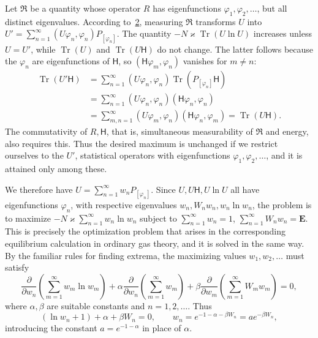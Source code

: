 \documentclass[fontsize=13pt,twoside,openany,headings=normal,parskip=false,bookmarkpackage=false,DIV=calc]{scrbook}
\begin{document}
Let $\mathfrak R$ be a quantity whose operator $R$ has eigenfunctions $\varphi_1,\varphi_2,\ldots$, but all distinct eigenvalues. According to~\hyperref[eq:V.1.2]{2}, measuring $\mathfrak R$ transforms $U$ into $U'=\sum_{n=1}^{\infty}(U\varphi_n,\varphi_n)P_{[\varphi_n]}$. The quantity $-N\varkappa\operatorname{Tr}(U\ln U)$ increases unless $U=U'$, while $\operatorname{Tr}(U)$ and $\operatorname{Tr}(U\mathsf{H})$ do not change. The latter follows because the $\varphi_n$ are eigenfunctions of $\mathsf{H}$, so $(\mathsf{H}\varphi_m,\varphi_n)$ vanishes for $m\ne n$:
\begin{align*}
\operatorname{Tr}(U'\mathsf{H})
&=\sum_{n=1}^{\infty}(U\varphi_n,\varphi_n)\operatorname{Tr}(P_{[\varphi_n]}\mathsf{H})\\
&=\sum_{n=1}^{\infty}(U\varphi_n,\varphi_n)(\mathsf{H}\varphi_n,\varphi_n)\\
&=\sum_{m,n=1}^{\infty}(U\varphi_m,\varphi_n)(\mathsf{H}\varphi_n,\varphi_m)
=\operatorname{Tr}(U\mathsf{H}).
\end{align*}
The commutativity of $R,\mathsf{H}$, that is, simultaneous measurability of $\mathfrak R$ and energy, also requires this. Thus the desired maximum is unchanged if we restrict ourselves to the $U'$, statistical operators with eigenfunctions $\varphi_1,\varphi_2,\ldots$, and it is attained only among these.

We therefore have $U=\sum_{n=1}^{\infty}w_nP_{[\varphi_n]}$. Since $U,U\mathsf{H},U\ln U$ all have eigenfunctions $\varphi_n$, with respective eigenvalues $w_n,W_nw_n,w_n\ln w_n$, the problem is to maximize $-N\varkappa\sum_{n=1}^{\infty}w_n\ln w_n$ subject to $\sum_{n=1}^{\infty}w_n=1$, $\sum_{n=1}^{\infty}W_nw_n=\mathbf E$. This is precisely the optimization problem that arises in the corresponding equilibrium calculation in ordinary gas theory, and it is solved in the same way. By the familiar rules for finding extrema, the maximizing values $w_1,w_2,\ldots$ must satisfy
\[
\frac{\partial}{\partial w_n}\left(\sum_{m=1}^{\infty}w_m\ln w_m\right)
+\alpha\frac{\partial}{\partial w_n}\left(\sum_{m=1}^{\infty}w_m\right)
+\beta\frac{\partial}{\partial w_m}\left(\sum_{m=1}^{\infty}W_mw_m\right)=0,
\]
where $\alpha,\beta$ are suitable constants and $n=1,2,\ldots$. Thus
\[
(\ln w_n+1)+\alpha+\beta W_n=0,\qquad
w_n=e^{-1-\alpha-\beta W_n}=ae^{-\beta W_n},
\]
introducing the constant $a=e^{-1-\alpha}$ in place of $\alpha$.
\end{document}
